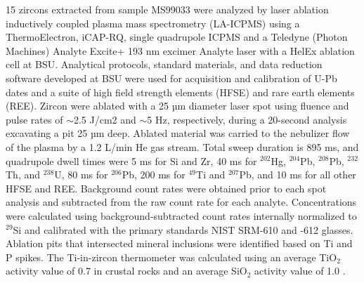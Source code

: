\documentclass[11pt,letterpaper]{article}
\begin{document}
15 zircons extracted from sample MS99033 were analyzed by laser ablation inductively coupled plasma mass spectrometry (LA-ICPMS) using a ThermoElectron, iCAP-RQ, single quadrupole ICPMS and a Teledyne (Photon Machines) Analyte Excite+ 193 nm excimer Analyte laser with a HelEx ablation cell at BSU. Analytical protocols, standard materials, and data reduction software developed at BSU were used for acquisition and calibration of U-Pb dates and a suite of high field strength elements (HFSE) and rare earth elements (REE). Zircon were ablated with a 25 µm diameter laser spot using fluence and pulse rates of $\sim$2.5 J/cm2 and $\sim$5 Hz, respectively, during a 20-second analysis excavating a pit 25 µm deep. Ablated material was carried to the nebulizer flow of the plasma by a 1.2 L/min He gas stream. Total sweep duration is 895 ms, and quadrupole dwell times were 5 ms for Si and Zr, 40 ms for $^{202}$Hg, $^{204}$Pb, $^{208}$Pb, $^{232}$Th, and $^{238}$U, 80 ms for $^{206}$Pb, 200 ms for $^{49}$Ti and $^{207}$Pb, and 10 ms for all other HFSE and REE. Background count rates were obtained prior to each spot analysis and subtracted from the raw count rate for each analyte. Concentrations were calculated using background-subtracted count rates internally normalized to $^{29}$Si and calibrated with the primary standards NIST SRM-610 and -612 glasses. Ablation pits that intersected mineral inclusions were identified based on Ti and P spikes. The Ti-in-zircon thermometer was calculated using an average TiO$_2$ activity value of 0.7 in crustal rocks \citep{Watson2006a} and an average SiO$_2$ activity value of 1.0 \citep{Ferry2007a}. 

\end{document}
